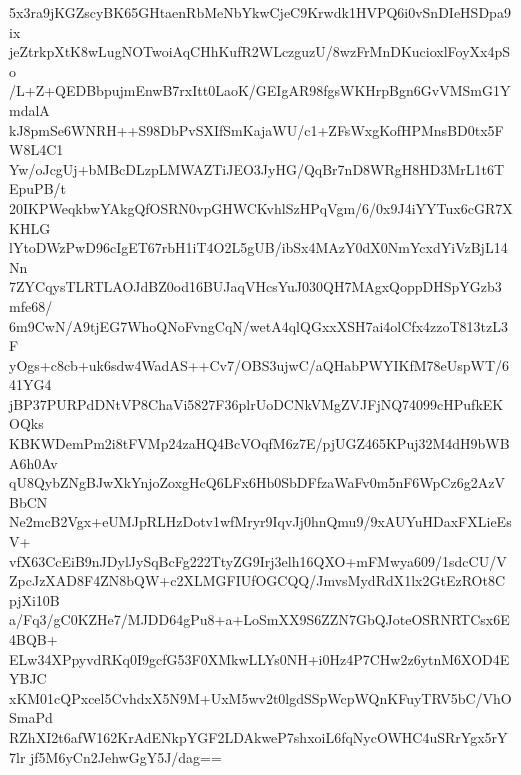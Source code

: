5x3ra9jKGZscyBK65GHtaenRbMeNbYkwCjeC9Krwdk1HVPQ6i0vSnDIeHSDpa9ix
jeZtrkpXtK8wLugNOTwoiAqCHhKufR2WLczguzU/8wzFrMnDKucioxlFoyXx4pSo
/L+Z+QEDBbpujmEnwB7rxItt0LaoK/GEIgAR98fgsWKHrpBgn6GvVMSmG1YmdalA
kJ8pmSe6WNRH++S98DbPvSXIfSmKajaWU/c1+ZFsWxgKofHPMnsBD0tx5FW8L4C1
Yw/oJcgUj+bMBcDLzpLMWAZTiJEO3JyHG/QqBr7nD8WRgH8HD3MrL1t6TEpuPB/t
20IKPWeqkbwYAkgQfOSRN0vpGHWCKvhlSzHPqVgm/6/0x9J4iYYTux6cGR7XKHLG
lYtoDWzPwD96cIgET67rbH1iT4O2L5gUB/ibSx4MAzY0dX0NmYcxdYiVzBjL14Nn
7ZYCqysTLRTLAOJdBZ0od16BUJaqVHcsYuJ030QH7MAgxQoppDHSpYGzb3mfe68/
6m9CwN/A9tjEG7WhoQNoFvngCqN/wetA4qlQGxxXSH7ai4olCfx4zzoT813tzL3F
yOgs+c8cb+uk6sdw4WadAS++Cv7/OBS3ujwC/aQHabPWYIKfM78eUspWT/641YG4
jBP37PURPdDNtVP8ChaVi5827F36plrUoDCNkVMgZVJFjNQ74099cHPufkEKOQks
KBKWDemPm2i8tFVMp24zaHQ4BcVOqfM6z7E/pjUGZ465KPuj32M4dH9bWBA6h0Av
qU8QybZNgBJwXkYnjoZoxgHcQ6LFx6Hb0SbDFfzaWaFv0m5nF6WpCz6g2AzVBbCN
Ne2mcB2Vgx+eUMJpRLHzDotv1wfMryr9IqvJj0hnQmu9/9xAUYuHDaxFXLieEsV+
vfX63CcEiB9nJDylJySqBcFg222TtyZG9Irj3elh16QXO+mFMwya609/1sdcCU/V
ZpcJzXAD8F4ZN8bQW+c2XLMGFIUfOGCQQ/JmvsMydRdX1lx2GtEzROt8CpjXi10B
a/Fq3/gC0KZHe7/MJDD64gPu8+a+LoSmXX9S6ZZN7GbQJoteOSRNRTCsx6E4BQB+
ELw34XPpyvdRKq0I9gcfG53F0XMkwLLYs0NH+i0Hz4P7CHw2z6ytnM6XOD4EYBJC
xKM01cQPxcel5CvhdxX5N9M+UxM5wv2t0lgdSSpWcpWQnKFuyTRV5bC/VhOSmaPd
RZhXI2t6afW162KrAdENkpYGF2LDAkweP7shxoiL6fqNycOWHC4uSRrYgx5rY7lr
jf5M6yCn2JehwGgY5J/dag==
